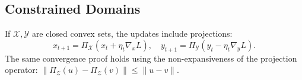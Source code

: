 \documentclass{article}
\begin{document}
\subsection*{Constrained Domains}
If $\mathcal{X}, \mathcal{Y}$ are closed convex sets, the updates include projections:
\[
x_{t+1} = \Pi_{\mathcal{X}}(x_t + \eta_t \nabla_x L), \quad y_{t+1} = \Pi_{\mathcal{Y}}(y_t - \eta_t \nabla_y L).
\]
The same convergence proof holds using the non-expansiveness of the projection operator: $\|\Pi_{\mathcal{Z}}(u) - \Pi_{\mathcal{Z}}(v)\| \le \|u - v\|$.

\end{document}
